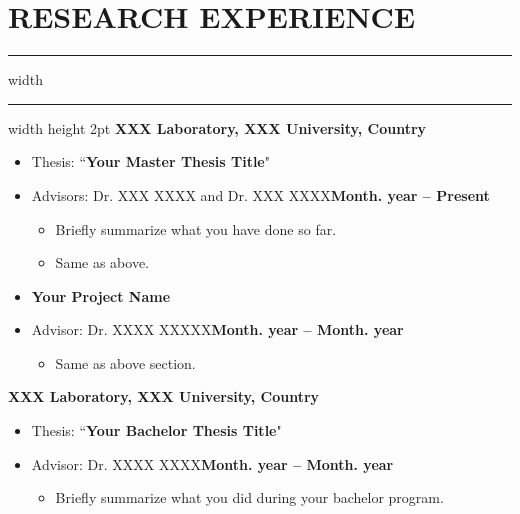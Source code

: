 \documentclass[12pt]{article}
\begin{document}
	\section*{\textbf{\Large R}\normalsize ESEARCH {\Large E}\normalsize XPERIENCE}
	\vspace{-2mm}
	\hrule width \hsize \kern 1mm \hrule width \hsize height 2pt
	\vspace{2mm}
		\textbf{XXX Laboratory, XXX University, Country}
		\vspace{-2mm}
		\begin{itemize}\setlength{\leftskip}{-5mm}
			\item[]Thesis: ``\textbf{Your Master Thesis Title}"
			\vspace{-2mm}
			\item[]Advisors: Dr. XXX XXXX and Dr. XXX XXXX\hspace{100pt}\textbf{Month. year -- Present}
			\vspace{-2mm}
			\begin{itemize}\setlength{\leftskip}{-5mm}
				\item Briefly summarize what you have done so far.
				\vspace{-2mm}
				\item Same as above.
			\end{itemize}
			\vspace{-2mm}
			\item[]\textbf{Your Project Name}
			\vspace{-2mm}
			\item[]Advisor: Dr. XXXX XXXXX\hspace{170pt}\textbf{Month. year -- Month. year}
				\begin{itemize}\setlength{\leftskip}{-5mm}
					\vspace{-3mm}
					\item Same as above section.
				\end{itemize}
		\end{itemize}
		\vspace{-2mm}
		\textbf{XXX Laboratory, XXX University, Country}
		\vspace{-2mm}
		\begin{itemize}\setlength{\leftskip}{-5mm}
			\item[]Thesis: ``\textbf{Your Bachelor Thesis Title}"
			\vspace{-2mm}
			\item[]Advisor: Dr. XXXX XXXX\hspace{180pt}\textbf{Month. year -- Month. year}
			\vspace{-2mm}
			\begin{itemize}\setlength{\leftskip}{-5mm}
				\item Briefly summarize what you did during your bachelor program.
				\vspace{-2mm}				
			\end{itemize}
		\end{itemize}
	
\end{document}
